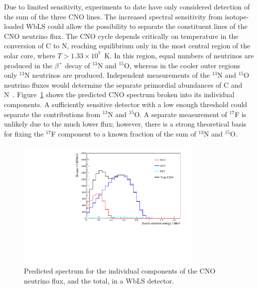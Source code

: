 Due to limited sensitivity, experiments to date have only considered detection of the sum of the three CNO lines.  The increased spectral sensitivity from isotope-loaded WbLS could allow the possibility to separate the constituent lines of the CNO neutrino flux.  The CNO cycle depends critically on temperature in the conversion of C to N, reaching equilibrium only in the most central region of the solar core, where $T > 1.33\times10^7$~K.  In this region, equal numbers of neutrinos are produced in the $\beta^+$ decay of  $^{13}$N and $^{15}$O, whereas in the cooler outer regions only $^{13}$N neutrinos are produced.  Independent measurements of the $^{13}$N and $^{15}$O neutrino fluxes would determine the separate primordial abundances of C and N~\cite{HRS}.  Figure~\ref{f:cno} shows the predicted CNO spectrum broken into its individual components.  A sufficiently sensitive detector with a low enough threshold could separate the contributions from $^{13}$N and $^{15}$O.  A separate measurement of $^{17}$F is unlikely due to the much lower flux; however, there is a strong theoretical basis for fixing the $^{17}$F component to a known fraction of the sum of $^{13}$N  and $^{15}$O.

\begin{figure}[!ht]
\begin{center}
\includegraphics[width=3.5in]{solar/DetectedSpecHistCNO.pdf}
\caption{Predicted spectrum for the individual components of the CNO neutrino flux, and the total, in a WbLS detector.
\label{f:cno}}
\end{center}
\vspace{-1.\baselineskip}
\end{figure}

